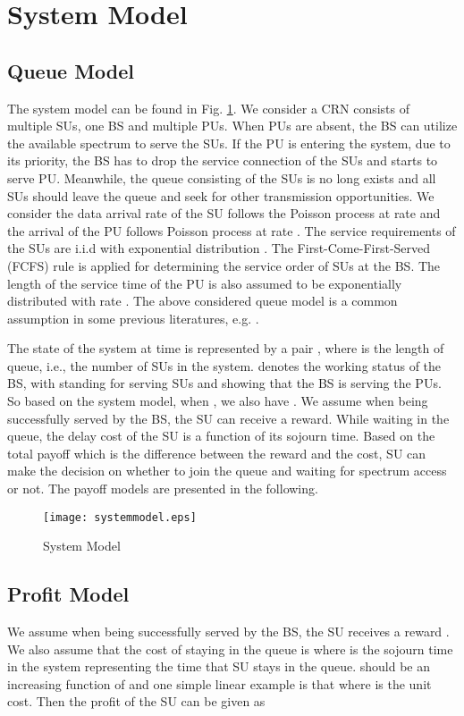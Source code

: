 \documentclass[journal]{IEEEtran}
\begin{document}
\section{System Model}
\label{Sec2}

\subsection{Queue Model}
The system model can be found in Fig. \ref{fig:1}. We consider a
CRN consists of multiple SUs, one BS and multiple PUs. When PUs are
absent, the BS can utilize the available spectrum to serve the SUs. If
the PU is entering the system, due to its priority, the BS has to drop the
service connection of the SUs and starts to serve PU. Meanwhile, the
queue consisting of the SUs is no long exists and all SUs should leave the queue
and seek for other transmission opportunities. We consider the
data arrival rate of the SU follows the Poisson process at rate 
and the arrival of the PU follows Poisson process at rate . The
service requirements of the SUs are i.i.d with exponential distribution
. The First-Come-First-Served (FCFS) rule is applied for
determining the service order of SUs at the BS. The length of the service
time of the PU is also assumed to be exponentially distributed with
rate . The above considered queue model is a common assumption in
some previous literatures, e.g. \cite{HLi} \cite{Do1}. \par

The state of the system at time  is represented by a pair
, where  is the length of queue, i.e., the
number of SUs in the system.  denotes the working status of
the BS, with  standing for serving SUs and  showing that the BS
is serving the PUs. So based on the system model, when , we
also have . We assume when being successfully served by the BS, the SU can receive a
reward. While waiting in the queue, the delay cost of the SU is a function of its sojourn time. Based on
the total payoff which is the difference between the reward and the cost, SU can make the decision on
whether to join the queue and waiting for spectrum access or not. The payoff models are presented in the following.

\begin{figure}[t]
\centering
\texttt{[image: systemmodel.eps]}
\caption{System Model} \label{fig:1}
\end{figure}

\subsection{Profit Model}
We assume when being successfully served by the BS, the SU receives a
reward . We also assume that the cost of staying in the
queue is  where  is the sojourn time in the system
representing the time that SU stays in the queue.  should be an
increasing function of  and one simple linear example is that
 where  is the unit cost. Then the profit of the
SU can be given as
\end{document}
